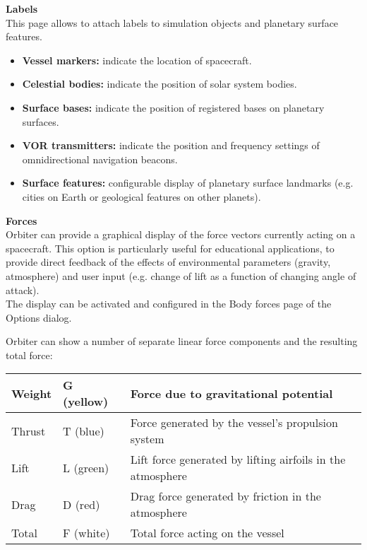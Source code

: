 \documentclass[Orbiter User Manual.tex]{subfiles}
\begin{document}
\noindent
\textbf{Labels}\\
This page allows to attach labels to simulation objects and planetary surface features.

\begin{figure}[H]
	\centering
\end{figure}

\begin{itemize}
\item \textbf{Vessel markers:} indicate the location of spacecraft.
\item \textbf{Celestial bodies:} indicate the position of solar system bodies.
\item \textbf{Surface bases:} indicate the position of registered bases on planetary surfaces.
\item \textbf{VOR transmitters:} indicate the position and frequency settings of omnidirectional navigation beacons.
\item \textbf{Surface features:} configurable display of planetary surface landmarks (e.g. cities on Earth or geological features on other planets).
\end{itemize}

\noindent
\textbf{Forces}\\
Orbiter can provide a graphical display of the force vectors currently acting on a spacecraft. This option is particularly useful for educational applications, to provide direct feedback of the effects of environmental parameters (gravity, atmosphere) and user input (e.g. change of lift as a function of changing angle of attack).\\
The display can be activated and configured in the Body forces page of the Options dialog.\\

\begin{figure}[H]
	\centering
\end{figure}

\noindent
Orbiter can show a number of separate linear force components and the resulting total force:

	\begin{longtable}{ |p{}|p{}|p{}| }
	\hline\rule{0pt}{2ex}
	Weight & G (yellow) & Force due to gravitational potential\\
	\hline\rule{0pt}{2ex}
	Thrust & T (blue) & Force generated by the vessel’s propulsion system\\
	\hline\rule{0pt}{2ex}
	Lift & L (green) & Lift force generated by lifting airfoils in the atmosphere\\
	\hline\rule{0pt}{2ex}
	Drag & D (red) & Drag force generated by friction in the atmosphere\\
	\hline\rule{0pt}{2ex}
	Total & F (white) & Total force acting on the vessel\\
	\hline
	\end{longtable}
\end{document}
